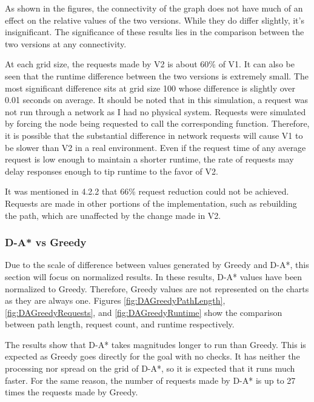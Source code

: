 	As shown in the figures, the connectivity of the graph does not have much of an effect on the relative values of the two versions. While they do differ slightly, it's insignificant. The significance of these results lies in the comparison between the two versions at any connectivity. 
	
	At each grid size, the requests made by V2 is about 60\% of V1. It can also be seen that the runtime difference between the two versions is extremely small. The most significant difference sits at grid size 100 whose difference is slightly over 0.01 seconds on average. It should be noted that in this simulation, a request was not run through a network as I had no physical system. Requests were simulated by forcing the node being requested to call the corresponding function. Therefore, it is possible that the substantial difference in network requests will cause V1 to be slower than V2 in a real environment. Even if the request time of any average request is low enough to maintain a shorter runtime, the rate of requests may delay responses enough to tip runtime to the favor of V2.	
	
	It was mentioned in 4.2.2 that 66\% request reduction could not be achieved. Requests are made in other portions of the implementation, such as rebuilding the path, which are unaffected by the change made in V2. 
		
		
		
	\subsubsection{D-A* vs Greedy}
	
	Due to the scale of difference between values generated by Greedy and D-A*, this section will focus on normalized results. In these results, D-A* values have been normalized to Greedy. Therefore, Greedy values are not represented on the charts as they are always one. Figures \ref{fig:DAGreedyPathLength}, \ref{fig:DAGreedyRequests}, and \ref{fig:DAGreedyRuntime} show the comparison between path length, request count, and runtime respectively.
	
	The results show that D-A* takes magnitudes longer to run than Greedy. This is expected as Greedy goes directly for the goal with no checks. It has neither the processing nor spread on the grid of D-A*, so it is expected that it runs much faster. For the same reason, the number of requests made by D-A* is up to 27 times the requests made by Greedy.
	
